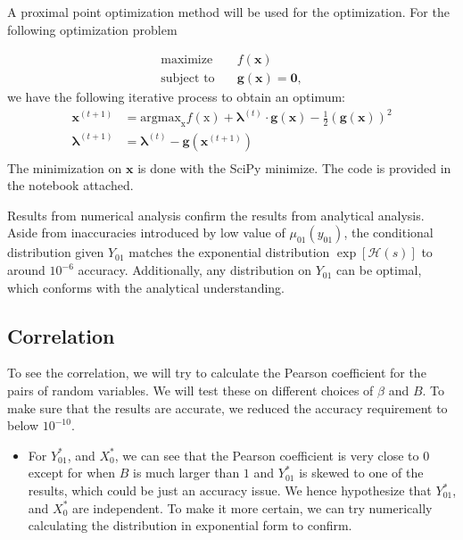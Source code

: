 \documentclass[12pt]{article}
\numberwithin{equation}{section}
\begin{document}
A proximal point optimization method will be used for the optimization. For the following optimization problem

$$\begin{aligned}
        \text{maximize}\quad   & f(\textbf{x})                        \\
        \text{subject to}\quad & \textbf{g}(\textbf{x}) = \textbf{0},
    \end{aligned}$$
we have the following iterative process to obtain an optimum:
$$\begin{aligned}
        \textbf{x}^{(t+1)}       & = \text{argmax}_{\text{x}} f(\text{x}) + \mathbf{\lambda}^{(t)} \cdot \textbf{g}(\textbf{x}) - \frac12 (\textbf{g}(\textbf{x}))^2 \\
        \mathbf{\lambda}^{(t+1)} & = \mathbf{\lambda}^{(t)} - \textbf{g}\left(\textbf{x}^{(t+1)}\right)                                                              \\
    \end{aligned}$$
The minimization on $\textbf{x}$ is done with the SciPy minimize. The code is provided in the notebook attached.

Results from numerical analysis confirm the results from analytical analysis. Aside from inaccuracies introduced by low value of $\mu_{01}(y_{01})$,
the conditional distribution given $Y_{01}$ matches the exponential distribution $\exp[\mathcal{H}(s)]$ to around $10^{-6}$ accuracy. Additionally,
any distribution on $Y_{01}$ can be optimal, which conforms with the analytical understanding.

\subsection{Correlation}

To see the correlation, we will try to calculate the Pearson coefficient for the pairs of random variables. We will test these on different choices of $\beta$ and $B$. To make sure that the results are accurate, we reduced the accuracy requirement to below $10^{-10}$.

\begin{itemize}
    \item For $Y^*_{01}$, and $X^*_{0}$, we can see that the Pearson coefficient is very close to $0$ except for when $B$ is much larger than $1$ and $Y^*_{01}$
          is skewed to one of the results, which could be just an accuracy issue. We hence hypothesize that $Y^*_{01}$, and $X^*_{0}$ are independent.
          To make it more certain, we can try numerically calculating the distribution in exponential form to confirm.
\end{itemize}
\end{document}
